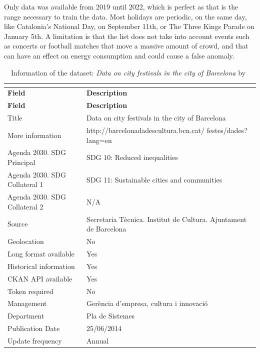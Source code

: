 \documentclass[a4paper,12pt,twoside]{ThesisStyle}
\begin{document}
Only data was available from 2019 until 2022, which is perfect as that is the range necessary to train the data. Most holidays are periodic, on the same day, like Catalonia's National Day, on September 11th, or The Three Kings Parade on January 5th. A limitation is that the list does not take into account events such as concerts or football matches that move a massive amount of crowd, and that can have an effect on energy consumption and could cause a false anomaly. 

\begin{longtable}{ll}
\caption{Information of the dataset: \textit{Data on city festivals in the city of Barcelona} by~\cite{FestivalsBCNOD}}  \\
\label{taula:InformationFestivalsDataset}  \\
\hline
\textbf{Field}  & \textbf{Description} \\
\hline
\endfirsthead
\hline
\textbf{Field}  & \textbf{Description} \\
\hline
\endhead
%
Title  & \parbox{7cm}{Data on city festivals in the city of Barcelona}  \\
More information  & \parbox{7cm}{http://barcelonadadescultura.bcn.cat/ festes/dades?lang=en} \\
Agenda 2030. SDG Principal        & SDG 10: Reduced inequalities    \\
Agenda 2030. SDG Collateral 1     & SDG 11: Sustainable cities and communities   \\
Agenda 2030. SDG Collateral 2     & N/A  \\
Source                            & \parbox{7.5cm}{Secretaria Tècnica. Institut de Cultura. Ajuntament de Barcelona}\\
Geolocation                       & No  \\
Long format available             & Yes  \\
Historical information            & Yes  \\
CKAN API available                & Yes   \\
Token required                    & No    \\
Management                        & \parbox{7.5cm}{Gerència d'empresa, cultura i innovació} \\
Department & Pla de Sistemes  \\
Publication Date                  & 25/06/2014   \\
Update frequency                  & Annual   \\
\hline
\end{longtable}
\end{document}
